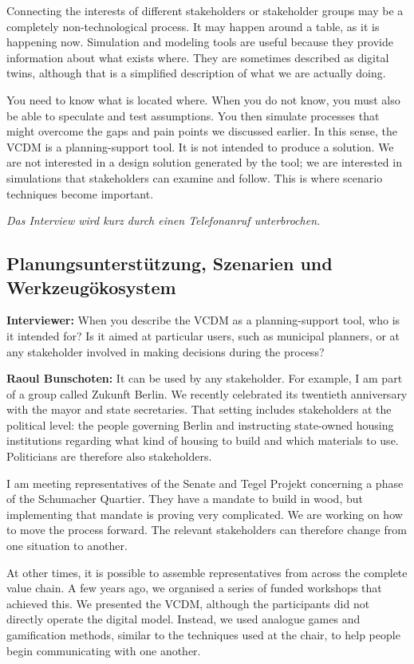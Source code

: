 Connecting the interests of different stakeholders or stakeholder groups may be a completely non-technological process. It may happen around a table, as it is happening now. Simulation and modeling tools are useful because they provide information about what exists where. They are sometimes described as digital twins, although that is a simplified description of what we are actually doing.

You need to know what is located where. When you do not know, you must also be able to speculate and test assumptions. You then simulate processes that might overcome the gaps and pain points we discussed earlier. In this sense, the VCDM is a planning-support tool. It is not intended to produce a solution. We are not interested in a design solution generated by the tool; we are interested in simulations that stakeholders can examine and follow. This is where scenario techniques become important.

\textit{Das Interview wird kurz durch einen Telefonanruf unterbrochen.}

\subsection{Planungsunterstützung, Szenarien und Werkzeugökosystem}

\textbf{Interviewer:} When you describe the VCDM as a planning-support tool, who is it intended for? Is it aimed at particular users, such as municipal planners, or at any stakeholder involved in making decisions during the process?

\textbf{Raoul Bunschoten:} It can be used by any stakeholder. For example, I am part of a group called Zukunft Berlin. We recently celebrated its twentieth anniversary with the mayor and state secretaries. That setting includes stakeholders at the political level: the people governing Berlin and instructing state-owned housing institutions regarding what kind of housing to build and which materials to use. Politicians are therefore also stakeholders.

I am meeting representatives of the Senate and Tegel Projekt concerning a phase of the Schumacher Quartier. They have a mandate to build in wood, but implementing that mandate is proving very complicated. We are working on how to move the process forward. The relevant stakeholders can therefore change from one situation to another.

At other times, it is possible to assemble representatives from across the complete value chain. A few years ago, we organised a series of funded workshops that achieved this. We presented the VCDM, although the participants did not directly operate the digital model. Instead, we used analogue games and gamification methods, similar to the techniques used at the chair, to help people begin communicating with one another.

